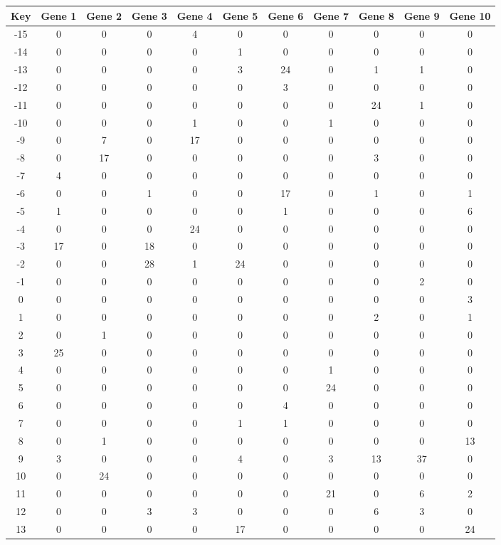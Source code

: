 \begin{tabular}{|c|c|c|c|c|c|c|c|c|c|c|}
\hline
Key & Gene 1 & Gene 2 & Gene 3 & Gene 4 & Gene 5 & Gene 6 & Gene 7 & Gene 8 & Gene 9 & Gene 10 \\
\hline
-15 & 0 & 0 & 0 & 4 & 0 & 0 & 0 & 0 & 0 & 0 \\
-14 & 0 & 0 & 0 & 0 & 1 & 0 & 0 & 0 & 0 & 0 \\
-13 & 0 & 0 & 0 & 0 & 3 & 24 & 0 & 1 & 1 & 0 \\
-12 & 0 & 0 & 0 & 0 & 0 & 3 & 0 & 0 & 0 & 0 \\
-11 & 0 & 0 & 0 & 0 & 0 & 0 & 0 & 24 & 1 & 0 \\
-10 & 0 & 0 & 0 & 1 & 0 & 0 & 1 & 0 & 0 & 0 \\
-9 & 0 & 7 & 0 & 17 & 0 & 0 & 0 & 0 & 0 & 0 \\
-8 & 0 & 17 & 0 & 0 & 0 & 0 & 0 & 3 & 0 & 0 \\
-7 & 4 & 0 & 0 & 0 & 0 & 0 & 0 & 0 & 0 & 0 \\
-6 & 0 & 0 & 1 & 0 & 0 & 17 & 0 & 1 & 0 & 1 \\
-5 & 1 & 0 & 0 & 0 & 0 & 1 & 0 & 0 & 0 & 6 \\
-4 & 0 & 0 & 0 & 24 & 0 & 0 & 0 & 0 & 0 & 0 \\
-3 & 17 & 0 & 18 & 0 & 0 & 0 & 0 & 0 & 0 & 0 \\
-2 & 0 & 0 & 28 & 1 & 24 & 0 & 0 & 0 & 0 & 0 \\
-1 & 0 & 0 & 0 & 0 & 0 & 0 & 0 & 0 & 2 & 0 \\
0 & 0 & 0 & 0 & 0 & 0 & 0 & 0 & 0 & 0 & 3 \\
1 & 0 & 0 & 0 & 0 & 0 & 0 & 0 & 2 & 0 & 1 \\
2 & 0 & 1 & 0 & 0 & 0 & 0 & 0 & 0 & 0 & 0 \\
3 & 25 & 0 & 0 & 0 & 0 & 0 & 0 & 0 & 0 & 0 \\
4 & 0 & 0 & 0 & 0 & 0 & 0 & 1 & 0 & 0 & 0 \\
5 & 0 & 0 & 0 & 0 & 0 & 0 & 24 & 0 & 0 & 0 \\
6 & 0 & 0 & 0 & 0 & 0 & 4 & 0 & 0 & 0 & 0 \\
7 & 0 & 0 & 0 & 0 & 1 & 1 & 0 & 0 & 0 & 0 \\
8 & 0 & 1 & 0 & 0 & 0 & 0 & 0 & 0 & 0 & 13 \\
9 & 3 & 0 & 0 & 0 & 4 & 0 & 3 & 13 & 37 & 0 \\
10 & 0 & 24 & 0 & 0 & 0 & 0 & 0 & 0 & 0 & 0 \\
11 & 0 & 0 & 0 & 0 & 0 & 0 & 21 & 0 & 6 & 2 \\
12 & 0 & 0 & 3 & 3 & 0 & 0 & 0 & 6 & 3 & 0 \\
13 & 0 & 0 & 0 & 0 & 17 & 0 & 0 & 0 & 0 & 24 \\
\hline
\end{tabular}